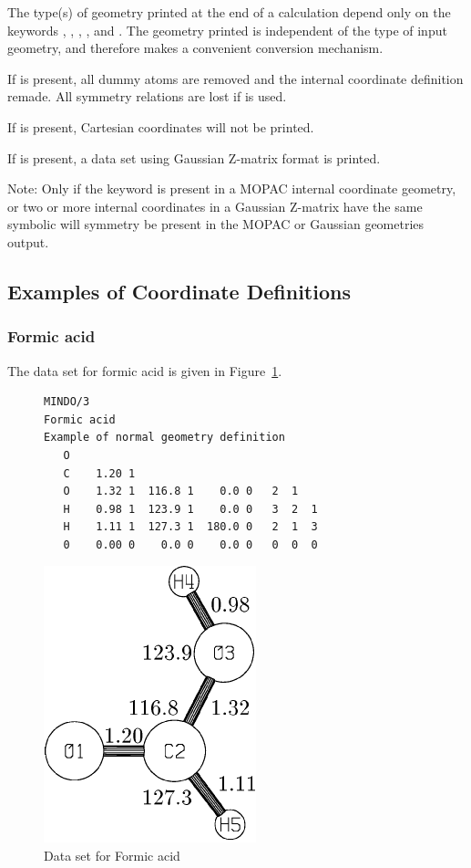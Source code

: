 The type(s) of geometry printed at the end  of  a    calculation
depend only on the keywords , , ,
, and .  The geometry printed is independent of the
type of  input  geometry,  and  therefore  makes  a convenient conversion
mechanism.

If  is present, all dummy atoms  are  removed  and  the  internal
coordinate  definition remade.  All symmetry relations are lost if 
is used.

If  is present, Cartesian coordinates will not be printed.

If  is present, a data set using Gaussian Z-matrix  format  is
printed.

Note:   Only if the keyword    is present in a MOPAC internal
coordinate geometry, or two or more internal coordinates in a Gaussian Z-matrix
have the same  symbolic  will symmetry be present in the MOPAC or Gaussian
geometries output.

\subsection{Examples of Coordinate Definitions}
\subsubsection{Formic acid}
The data set for formic acid is given in Figure~\ref{hcooh}.
\begin{figure}
\begin{makeimage}
\end{makeimage}
\begin{verbatim}
MINDO/3
Formic acid
Example of normal geometry definition
   O
   C    1.20 1
   O    1.32 1  116.8 1    0.0 0   2  1
   H    0.98 1  123.9 1    0.0 0   3  2  1
   H    1.11 1  127.3 1  180.0 0   2  1  3
   0    0.00 0    0.0 0    0.0 0   0  0  0
\end{verbatim}
\begin{center}
\includegraphics{pichcooh}
\end{center}
\caption{\label{hcooh} Data set for Formic acid}
\end{figure}

